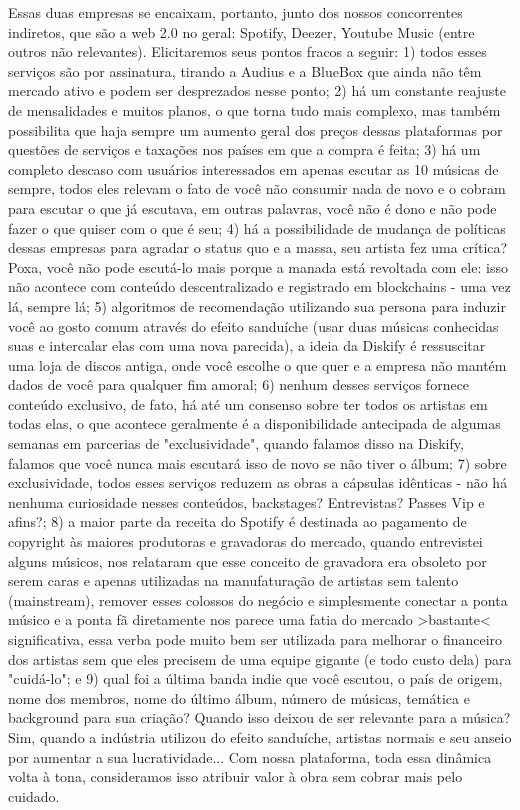 \documentclass[onecolumn,12pt]{asme2ej}
\begin{document}
Essas duas empresas se encaixam, portanto, junto dos nossos concorrentes indiretos, que são a web 2.0 no geral: Spotify, Deezer, Youtube Music (entre outros não relevantes). Elicitaremos seus pontos fracos a seguir: 1) todos esses serviços são por assinatura, tirando a Audius e a BlueBox que ainda não têm mercado ativo e podem ser desprezados nesse ponto; 2) há um constante reajuste de mensalidades e muitos planos, o que torna tudo mais complexo, mas também possibilita que haja sempre um aumento geral dos preços dessas plataformas por questões de serviços e taxações nos países em que a compra é feita; 3) há um completo descaso com usuários interessados em apenas escutar as 10 músicas de sempre, todos eles relevam o fato de você não consumir nada de novo e o cobram para escutar o que já escutava, em outras palavras, você não é dono e não pode fazer o que quiser com o que é seu; 4) há a possibilidade de mudança de políticas dessas empresas para agradar o status quo e a massa, seu artista fez uma crítica? Poxa, você não pode escutá-lo mais porque a manada está revoltada com ele: isso não acontece com conteúdo descentralizado e registrado em blockchains - uma vez lá, sempre lá; 5) algoritmos de recomendação utilizando sua persona para induzir você ao gosto comum através do efeito sanduíche (usar duas músicas conhecidas suas e intercalar elas com uma nova parecida), a ideia da Diskify é ressuscitar uma loja de discos antiga, onde você escolhe o que quer e a empresa não mantém dados de você para qualquer fim amoral; 6) nenhum desses serviços fornece conteúdo exclusivo, de fato, há até um consenso sobre ter todos os artistas em todas elas, o que acontece geralmente é a disponibilidade antecipada de algumas semanas em parcerias de "exclusividade", quando falamos disso na Diskify, falamos que você nunca mais escutará isso de novo se não tiver o álbum; 7) sobre exclusividade, todos esses serviços reduzem as obras a cápsulas idênticas - não há nenhuma curiosidade nesses conteúdos, backstages? Entrevistas? Passes Vip e afins?; 8) a maior parte da receita do Spotify é destinada ao pagamento de copyright às maiores produtoras
e gravadoras do mercado, quando entrevistei alguns músicos, nos relataram que esse conceito de gravadora era obsoleto por serem caras e apenas utilizadas na manufaturação de artistas sem talento (mainstream), remover esses colossos do negócio e simplesmente conectar a ponta músico e a ponta fã diretamente nos parece uma fatia do mercado >bastante< significativa, essa verba pode muito bem ser utilizada para melhorar o financeiro dos artistas sem que eles precisem de uma equipe gigante (e todo custo dela) para "cuidá-lo"; e 9) qual foi a última banda indie que você escutou, o país de origem, nome dos membros, nome do último álbum, número de músicas, temática e background para sua criação? Quando isso deixou de ser relevante para a música? Sim, quando a indústria utilizou do efeito sanduíche, artistas normais e seu anseio por aumentar a sua lucratividade... Com nossa plataforma, toda essa dinâmica volta à tona, consideramos isso atribuir valor à obra sem cobrar mais pelo cuidado.
\end{document}

